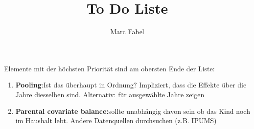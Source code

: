 \documentclass[11pt,a4paper]{article}
\author{Marc Fabel}
\title{To Do Liste}
\date{\flushleft{Last revision of the document: \today}}
\begin{document}
\maketitle




Elemente mit der höchsten Priorität sind am obersten Ende der Liste:
\begin{enumerate}
\item \textbf{Pooling}:\newline Ist das  überhaupt in Ordnung? Impliziert, dass die Effekte über die Jahre diesselben sind. Alternativ: für ausgewählte	Jahre zeigen
\item \textbf{Parental covariate balance:}\newline sollte unabhängig davon sein ob das Kind noch im Haushalt lebt. Andere Datenquellen durchsuchen (z.B. IPUMS)
\end{enumerate}
\end{document}
